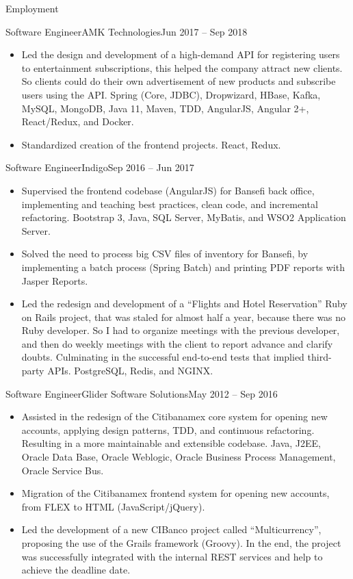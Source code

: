 \documentclass[calibri]{../macdowell-cv/mcdowellcv}
\begin{document}
\begin{cvsection}{Employment}
		\begin{cvsubsection}{Software Engineer}{AMK Technologies}{Jun 2017 -- Sep 2018}
			\begin{itemize}
				\item Led the design and development of a high-demand API for registering users to entertainment subscriptions, this helped the company attract new clients. So clients could do their own advertisement of new products and subscribe users using the API. Spring (Core, JDBC), Dropwizard, HBase, Kafka, MySQL, MongoDB, Java 11, Maven, TDD, AngularJS, Angular 2+, React/Redux, and Docker.
				\item Standardized creation of the frontend projects. React, Redux.
			\end{itemize}
		\end{cvsubsection}

		\begin{cvsubsection}{Software Engineer}{Indigo}{Sep 2016 -- Jun 2017}		
			\begin{itemize}
				\item Supervised the frontend codebase (AngularJS) for Bansefi back office, implementing and teaching best practices, clean code, and incremental refactoring. Bootstrap 3, Java, SQL Server, MyBatis, and WSO2 Application Server.
				\item Solved the need to process big CSV files of inventory for Bansefi, by implementing a batch process (Spring Batch) and printing PDF reports with Jasper Reports.
				\item Led the redesign and development of a ``Flights and Hotel Reservation'' Ruby on Rails project, that was staled for almost half a year, because there was no Ruby developer. So I had to organize meetings with the previous developer, and then do weekly meetings with the client to report advance and clarify doubts. Culminating in the successful end-to-end tests that implied third-party APIs. PostgreSQL, Redis, and NGINX.
			\end{itemize}
		\end{cvsubsection}
		
		\begin{cvsubsection}{Software Engineer}{Glider Software Solutions}{May 2012 -- Sep 2016}	
			\begin{itemize}
				\item Assisted in the redesign of the Citibanamex core system for opening new accounts, applying design patterns, TDD, and continuous refactoring. Resulting in a more maintainable and extensible codebase. Java, J2EE, Oracle Data Base, Oracle Weblogic, Oracle Business Process Management, Oracle Service Bus.
				\item Migration of the Citibanamex frontend system for opening new accounts, from FLEX to HTML (JavaScript/jQuery).
				\item Led the development of a new CIBanco project called ``Multicurrency'', proposing the use of the Grails framework (Groovy). In the end, the project was successfully integrated with the internal REST services and help to achieve the deadline date.
			\end{itemize}
		\end{cvsubsection}


\end{cvsection}
\end{document}
